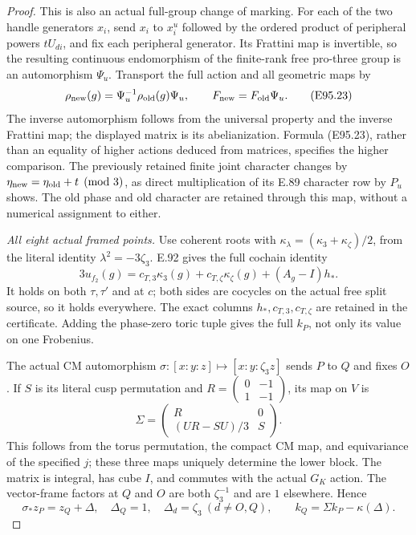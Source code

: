 \begin{proof}
This is also an actual full-group change of marking.
For each of the two handle generators $x_i$, send
$x_i$ to $x_i^u$ followed by the ordered product of
peripheral powers $tU_{di}$, and fix each peripheral
generator. Its Frattini map is invertible, so the
resulting continuous endomorphism of the finite-rank
free pro-three group is an automorphism $\Psi_u$.
Transport the full action and all geometric maps by
\[
 \rho_{\rm new}(g)=\Psi_u^{-1}\rho_{\rm old}(g)\Psi_u,
                \qquad F_{\rm new}=F_{\rm old}\Psi_u.
 \tag{E95.23}
\]
The inverse automorphism follows from the universal
property and the inverse Frattini map; the displayed
matrix is its abelianization. Formula (E95.23), rather
than an equality of higher actions deduced from matrices,
specifies the higher comparison. The previously retained
finite joint character changes by
$\eta_{\rm new}=\eta_{\rm old}+t\pmod3$, as direct
multiplication of its E.89 character row by $P_u$ shows.
The old phase and old character are retained through
this map, without a numerical assignment to either.

\emph{All eight actual framed points.}
Use coherent roots with
$\kappa_\lambda=(\kappa_3+\kappa_\zeta)/2$, from the
literal identity $\lambda^2=-3\zeta_3$. E.92 gives the
full cochain identity
\[
 3u_{f_2}(g)=c_{T,3}\kappa_3(g)+c_{T,\zeta}\kappa_\zeta(g)
                              +(A_g-I)h_*.
 \tag{E95.24}
\]
It holds on both $\tau,\tau'$ and at $c$; both sides
are cocycles on the actual free split source, so it
holds everywhere. The exact columns $h_*,c_{T,3},c_{T,\zeta}$
are retained in the certificate. Adding the phase-zero
toric tuple gives the full $k_P$, not only its value on
one Frobenius.

The actual CM automorphism
$\sigma:[x:y:z]\mapsto[x:y:\zeta_3z]$ sends $P$ to
$Q$ and fixes $O$. If $S$ is its literal cusp permutation
and $R=\left(\begin{smallmatrix}0&-1\\1&-1\end{smallmatrix}\right)$,
its map on $V$ is
\[
 \Sigma=\begin{pmatrix}R&0\\(UR-SU)/3&S\end{pmatrix}.
 \tag{E95.25}
\]
This follows from the torus permutation, the compact CM
map, and equivariance of the specified $j$; these three
maps uniquely determine the lower block. The matrix is
integral, has cube $I$, and commutes with the actual
$G_K$ action. The vector-frame factors at $Q$ and $O$
are both $\zeta_3^{-1}$ and are $1$ elsewhere. Hence
\[
       \sigma_*z_P=z_Q+\Delta,
 \quad \Delta_Q=1,\quad\Delta_d=\zeta_3\ (d\ne O,Q),
       \qquad k_Q=\Sigma k_P-\kappa(\Delta).
 \tag{E95.26}
\]


\end{proof}

